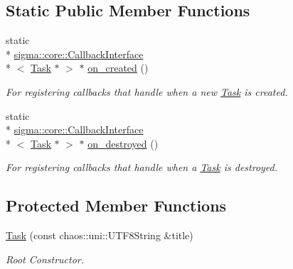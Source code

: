 \subsection*{Static Public Member Functions}
\begin{DoxyCompactItemize}
\item 
static \\*
\hyperlink{classsigma_1_1core_1_1_callback_interface}{sigma\-::core\-::\-Callback\-Interface}\\*
$<$ \hyperlink{classsigma_1_1core_1_1tasks_1_1_task}{Task} $\ast$ $>$ $\ast$ \hyperlink{classsigma_1_1core_1_1tasks_1_1_task_ab5adda36bbe6b20916f582ffeb311a13}{on\-\_\-created} ()
\begin{DoxyCompactList}\small\item\em For registering callbacks that handle when a new \hyperlink{classsigma_1_1core_1_1tasks_1_1_task}{Task} is created. \end{DoxyCompactList}\item 
static \\*
\hyperlink{classsigma_1_1core_1_1_callback_interface}{sigma\-::core\-::\-Callback\-Interface}\\*
$<$ \hyperlink{classsigma_1_1core_1_1tasks_1_1_task}{Task} $\ast$ $>$ $\ast$ \hyperlink{classsigma_1_1core_1_1tasks_1_1_task_a720571d12a0e2b41c918f448f5fc81db}{on\-\_\-destroyed} ()
\begin{DoxyCompactList}\small\item\em For registering callbacks that handle when a \hyperlink{classsigma_1_1core_1_1tasks_1_1_task}{Task} is destroyed. \end{DoxyCompactList}\end{DoxyCompactItemize}
\subsection*{Protected Member Functions}
\begin{DoxyCompactItemize}
\item 
\hyperlink{classsigma_1_1core_1_1tasks_1_1_task_a22316f108f9eeea2d2497b825b068c84}{Task} (const chaos\-::uni\-::\-U\-T\-F8\-String \&title)
\begin{DoxyCompactList}\small\item\em Root Constructor. \end{DoxyCompactList}\end{DoxyCompactItemize}
